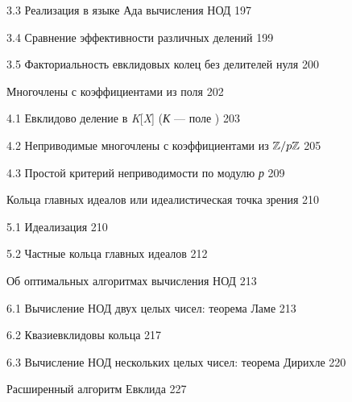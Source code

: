 \documentclass{mai_book}
\begin{document}
{    3.3 Реализация в языке Ада вычисления НОД \dotfill \hspace{0.5cm} 197 
    
    3.4 Сравнение эффективности различных делений\dotfill \hspace{0.5cm} 199 
    
    3.5 Факториальность евклидовых колец без делителей нуля \dotfill \hspace{0.5cm} 200
    
 \hspace{0.05cm}Многочлены с коэффициентами из поля \dotfill \hspace{0.5cm} 202 
    
    4.1 Евклидово деление в \emph{K}[\emph{X}] (\emph{К} — поле ) \dotfill \hspace{0.5cm} 203 
    
    4.2 Неприводимые многочлены с коэффициентами из $\mathbb{Z}/\small{p}\mathbb{Z}$ \dotfill \hspace{0.5cm} 205 
    
    4.3 Простой критерий неприводимости по модулю \emph{р} \dotfill \hspace{0.5cm} 209
    
 \hspace{0.05cm} Кольца главных идеалов или идеалистическая точка зрения \dotfill \hspace{0.5cm} 210
    
    5.1 Идеализация \dotfill \hspace{0.5cm} 210
    
    5.2 Частные кольца главных идеалов \dotfill \hspace{0.5cm} 212
    
 \hspace{0.05cm} Об оптимальных алгоритмах вычисления НОД \dotfill \hspace{0.5cm} 213 
    
    6.1 Вычисление НОД двух целых чисел: теорема Ламе \dotfill \hspace{0.5cm} 213 
    
    6.2 Квазиевклидовы кольца \dotfill \hspace{0.5cm} 217 
    
    6.3 Вычисление НОД нескольких целых чисел: теорема Дирихле \dotfill \hspace{0.5cm} 220
    
 \hspace{0.05cm} Расширенный алгоритм Евклида \dotfill \hspace{0.5cm} 227 
    
}
\end{document}
